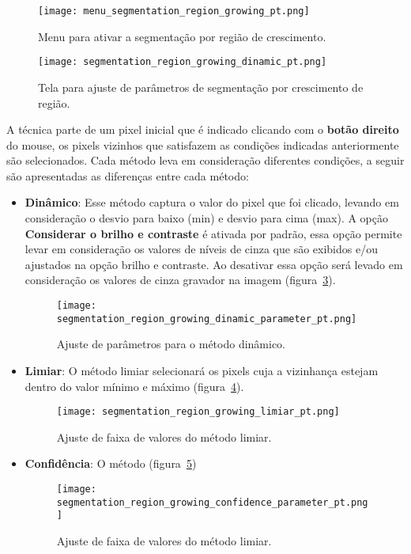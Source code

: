 \begin{figure}[!htb]
\centering
\texttt{[image: menu\_segmentation\_region\_growing\_pt.png]}
\caption{Menu para ativar a segmentação por região de crescimento.}
\label{fig:menu_segmentation_region_growing_pt}
\end{figure}

\begin{figure}[!htb]
\centering
\texttt{[image: segmentation\_region\_growing\_dinamic\_pt.png]}
\caption{Tela para ajuste de parâmetros de segmentação por crescimento de região.}
\label{fig:segmentation_region_growing_dinamic}
\end{figure}

A técnica parte de um pixel inicial que é indicado clicando com o \textbf{botão direito} do mouse, os pixels vizinhos que satisfazem as condições indicadas anteriormente são selecionados. Cada método leva em consideração diferentes condições, a seguir são apresentadas as diferenças entre cada método:

\begin{itemize}
	\item \textbf{Dinâmico}: Esse método captura o valor do pixel que foi clicado, levando em consideração o desvio para baixo (min) e desvio para cima (max). A opção \textbf{Considerar o brilho e contraste} é ativada por padrão, essa opção permite levar em consideração os valores de níveis de cinza que são exibidos e/ou ajustados na opção brilho e contraste. Ao desativar essa opção será levado em consideração os valores de cinza gravador na imagem (figura~\ref{fig:segmentation_region_growing_dinamic_parameter}). 
	
	\begin{figure}[!htb]
	\centering
	\texttt{[image: segmentation\_region\_growing\_dinamic\_parameter\_pt.png]}
	\caption{Ajuste de parâmetros para o método dinâmico.}
	\label{fig:segmentation_region_growing_dinamic_parameter}
	\end{figure}
	
	\item \textbf{Limiar}: O método limiar selecionará os pixels cuja a vizinhança estejam dentro do valor mínimo e máximo (figura~\ref{fig:segmentation_region_growing_limiar}).

	\begin{figure}[!htb]
	\centering
	\texttt{[image: segmentation\_region\_growing\_limiar\_pt.png]}
	\caption{Ajuste de faixa de valores do método limiar.}
	\label{fig:segmentation_region_growing_limiar}
	\end{figure}	
	
	\item \textbf{Confidência}: O método (figura~\ref{fig:segmentation_region_growing_confidence_parameter})
	
	\begin{figure}[!htb]
	\centering
	\texttt{[image: segmentation\_region\_growing\_confidence\_parameter\_pt.png]}
	\caption{Ajuste de faixa de valores do método limiar.}
	\label{fig:segmentation_region_growing_confidence_parameter}
	\end{figure}	
	
	
\end{itemize}